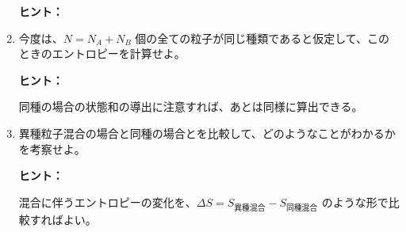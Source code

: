 \documentclass[uplatex,dvipdfmx,a4paper,11pt]{jsarticle}
\begin{document}
\begin{enumerate}
\begin{itembox}[l]{{\bf ヒント：}}
\end{itembox}

\color{black}

\item
今度は、$N = N_A + N_B$ 個の全ての粒子が同じ種類であると仮定して、このときのエントロピーを計算せよ。

\begin{itembox}[l]{{\bf ヒント：}}

同種の場合の状態和の導出に注意すれば、あとは同様に算出できる。

\end{itembox}

\color{black}

\item
異種粒子混合の場合と同種の場合とを比較して、どのようなことがわかるかを考察せよ。

\begin{itembox}[l]{{\bf ヒント：}}

混合に伴うエントロピーの変化を、$\Delta S= S_{\text{異種混合}} - S_{\text{同種混合}}$ のような形で比較すればよい。

\end{itembox}

\color{black}

\end{enumerate}

\newpage
\end{document}
